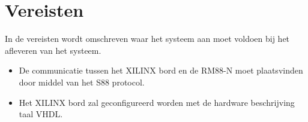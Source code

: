 \textit{}\chapter{Vereisten}
In de vereisten wordt omschreven waar het systeem aan moet voldoen bij het afleveren van het systeem.\\
\begin{itemize}
	\item De communicatie tussen het XILINX bord en de RM88-N moet plaatsvinden door middel van het S88 protocol.
	\item Het XILINX bord zal geconfigureerd worden met de hardware beschrijving taal VHDL.
\end{itemize}